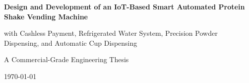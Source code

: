 \documentclass[12pt,a4paper,oneside]{report}
\numberwithin{equation}{chapter}
\numberwithin{figure}{chapter}
\numberwithin{table}{chapter}
\begin{document}
\begin{titlepage}
  \centering
  \vspace*{2.5cm}
  {\LARGE\bfseries Design and Development of an IoT-Based Smart Automated
   Protein Shake Vending Machine\par}
  \vspace{0.6cm}
  {\large with Cashless Payment, Refrigerated Water System, Precision Powder
   Dispensing, and Automatic Cup Dispensing\par}
  \vspace{2.2cm}
  {\large A Commercial-Grade Engineering Thesis\par}
  \vfill
  {\large \today\par}
\end{titlepage}

\tableofcontents
\listoffigures
\listoftables
\clearpage





\end{document}
